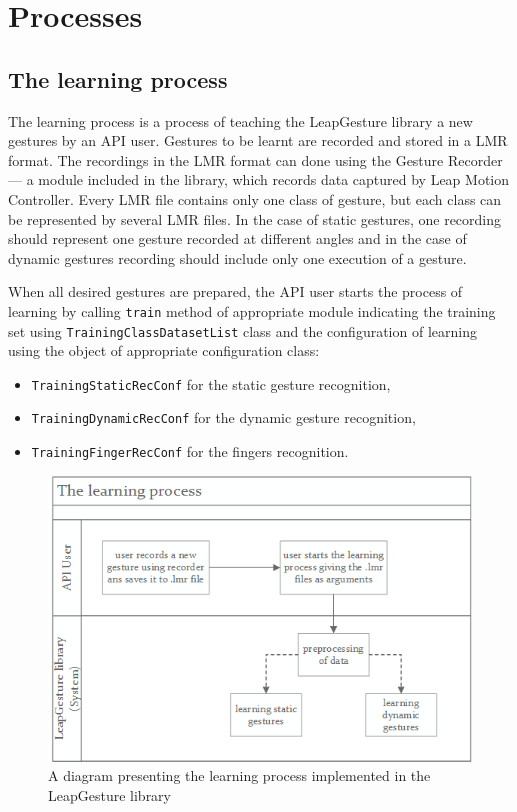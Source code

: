 \section{Processes}\label{processesSection}

\subsection{The learning process}
The learning process is a process of teaching the LeapGesture library a new gestures by an API user.
Gestures to be learnt are recorded and stored in a LMR format.
The recordings in the LMR format can done using the Gesture Recorder --- a module included in the library, which records data captured by Leap Motion Controller.
Every LMR file contains only one class of gesture, but each class can be represented by several LMR files.
In the case of static gestures, one recording should represent one gesture recorded at different angles and in the case of dynamic gestures recording should include only one execution of a gesture.

When all desired gestures are prepared, the API user starts the process of learning by calling \texttt{train} method of appropriate module indicating the training set using \texttt{TrainingClassDatasetList} class and the configuration of learning using the object of appropriate configuration class:
\begin{itemize}
\item \texttt{TrainingStaticRecConf} for the static gesture recognition,
\item \texttt{TrainingDynamicRecConf} for the dynamic gesture recognition,
\item \texttt{TrainingFingerRecConf} for the fingers recognition.
\end{itemize}


\begin{figure}[htb]
\centering
 \includegraphics[width=0.75\columnwidth]{figures/learningProcess.png}
 \caption{A diagram presenting the learning process implemented in the LeapGesture library}
 \label{learningprocess}
\end{figure}

